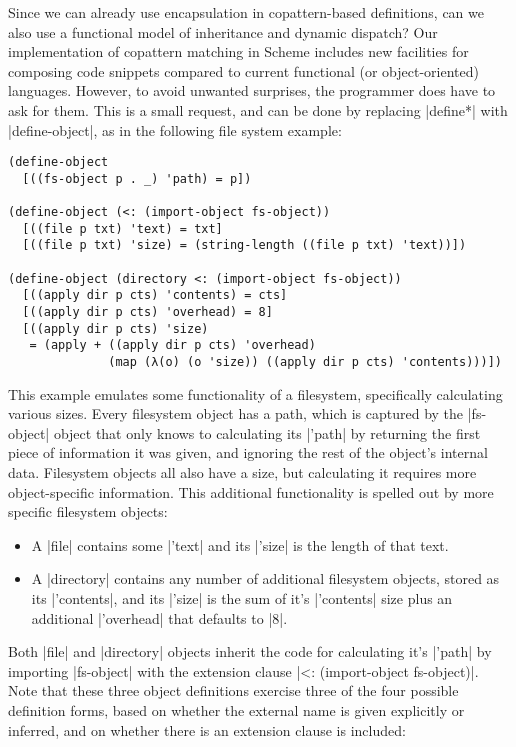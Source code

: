 Since we can already use encapsulation in copattern-based definitions, can we also use a functional model \cite{abadi96} of inheritance and dynamic dispatch?
Our implementation of copattern matching in Scheme includes new facilities for composing code snippets compared to current functional (or object-oriented) languages.
However, to avoid unwanted surprises, the programmer does have to ask for them.
This is a small request, and can be done by replacing \scm|define*| with \scm|define-object|, as in the following file system example:
\begin{verbatim}
(define-object
  [((fs-object p . _) 'path) = p])

(define-object (<: (import-object fs-object))
  [((file p txt) 'text) = txt]
  [((file p txt) 'size) = (string-length ((file p txt) 'text))])

(define-object (directory <: (import-object fs-object))
  [((apply dir p cts) 'contents) = cts]
  [((apply dir p cts) 'overhead) = 8]
  [((apply dir p cts) 'size)
   = (apply + ((apply dir p cts) 'overhead)
              (map (λ(o) (o 'size)) ((apply dir p cts) 'contents)))])
\end{verbatim}
This example emulates some functionality of a filesystem, specifically calculating various sizes.
Every filesystem object has a path, which is captured by the \scm|fs-object| object that only knows to calculating its \scm|'path| by returning the first piece of information it was given, and ignoring the rest of the object's internal data.
Filesystem objects all also have a size, but calculating it requires more object-specific information.
This additional functionality is spelled out by more specific filesystem objects:
\begin{itemize}
\item A \scm|file| contains some \scm|'text| and its \scm|'size| is the length of that text.
\item A \scm|directory| contains any number of additional filesystem objects, stored as its \scm|'contents|, and its \scm|'size| is the sum of it's \scm|'contents| size plus an additional \scm|'overhead| that defaults to \scm|8|.
\end{itemize}
Both \scm|file| and \scm|directory| objects inherit the code for calculating it's \scm|'path| by importing \scm|fs-object| with the extension clause \scm|<: (import-object fs-object)|.
Note that these three object definitions exercise three of the four possible definition forms, based on whether the external name is given explicitly or inferred, and on whether there is an extension clause is included:
